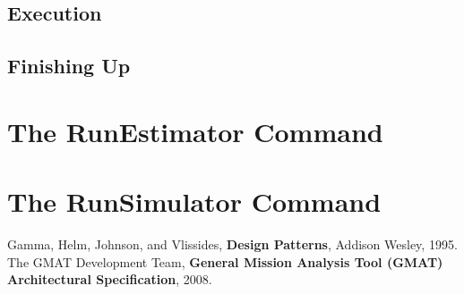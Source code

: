 \documentclass[10pt]{article}
\begin{document}
\subsection{Execution}

\subsection{Finishing Up}

\section{The RunEstimator Command}

\section{The RunSimulator Command}

\begin{thebibliography}{99}

 Gamma, Helm, Johnson, and Vlissides, \textbf{Design Patterns}, Addison
Wesley, 1995.
 The GMAT Development Team, \textbf{General Mission Analysis Tool (GMAT)
Architectural Specification}, 2008.

\end{thebibliography}
\end{document}
